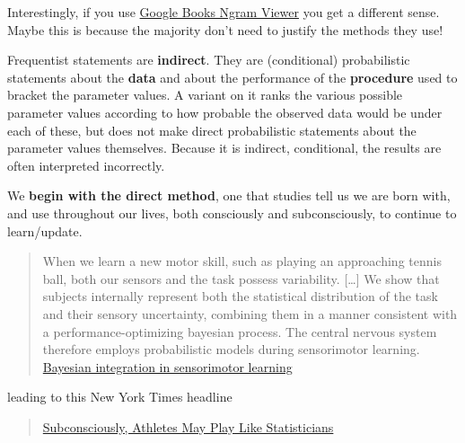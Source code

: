 \documentclass[]{book}
\begin{document}
Interestingly, if you use
\href{https://books.google.com/ngrams/graph?content=frequentist+approach\%2C+bayesian+approach\&case_insensitive=on\&year_start=1800\&year_end=2008\&corpus=15\&smoothing=3\&share=\&direct_url=t4\%3B\%2Cfrequentist\%20approach\%3B\%2Cc0\%3B\%2Cs0\%3B\%3Bfrequentist\%20approach\%3B\%2Cc0\%3B\%3BFrequentist\%20approach\%3B\%2Cc0\%3B\%3BFrequentist\%20Approach\%3B\%2Cc0\%3B.t4\%3B\%2Cbayesian\%20approach\%3B\%2Cc0\%3B\%2Cs0\%3B\%3BBayesian\%20approach\%3B\%2Cc0\%3B\%3BBayesian\%20Approach\%3B\%2Cc0\%3B\%3BBAYESIAN\%20APPROACH\%3B\%2Cc0\%3B\%3Bbayesian\%20approach\%3B\%2Cc0}{Google Books Ngram Viewer} you get a different sense. Maybe this is because the majority don't need to justify the methods they use!

Frequentist statements are \textbf{indirect}. They are (conditional) probabilistic statements about the \textbf{data} and about the performance of the \textbf{procedure} used to bracket the parameter values. A variant on it ranks the various possible parameter values according to how probable the observed data would be under each of these, but does not make direct probabilistic statements about the parameter values themselves. Because it is indirect, conditional, the results are often interpreted incorrectly.

We \textbf{begin with the direct method}, one that studies tell us we are born with, and use throughout our lives, both consciously and subconsciously, to continue to learn/update.

\begin{quote}
When we learn a new motor skill, such as playing an approaching
tennis ball, both our sensors and the task possess variability.
{[}\ldots{}{]} We show that subjects internally represent both the statistical
distribution of the task and their sensory uncertainty,
combining them in a manner consistent with a performance-optimizing bayesian process. The central nervous system therefore employs probabilistic models during sensorimotor learning. \href{http://www.medicine.mcgill.ca/epidemiology/hanley/bios601/ch10Bayes/nature02169.pdf}{Bayesian integration in sensorimotor learning}
\end{quote}

leading to this New York Times headline

\begin{quote}
\href{http://www.medicine.mcgill.ca/epidemiology/hanley/bios601/ch10Bayes/AthletesStatisticians.pdf}{Subconsciously, Athletes May Play Like Statisticians}
\end{quote}
\end{document}

